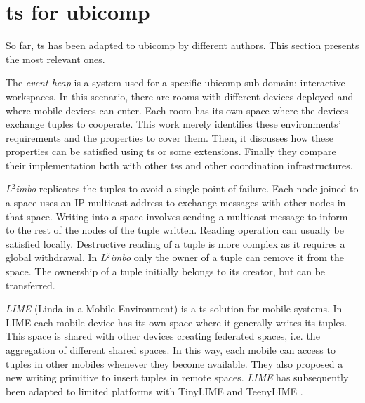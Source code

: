 \section{\acl{ts} for \ac{ubicomp}}
\label{sec:soa_ts_ubicomp}

So far, \acl{ts} has been adapted to \acl{ubicomp} by different authors.
This section presents the most relevant ones. %




The \emph{event heap} \citep{johanson_extending_2004} is a system used for a specific \ac{ubicomp} sub-domain: interactive workspaces.
In this scenario, there are rooms with different devices deployed and where mobile devices can enter.
Each room has its own space where the devices exchange tuples to cooperate.
This work merely identifies these environments' requirements and the properties to cover them. %
Then, it discusses how these properties can be satisfied using \ac{ts} or some extensions.
Finally they compare their implementation both with other \acp{ts} and other coordination infrastructures. %


\emph{L$^2$imbo} \citep{davies_l2imbo:_1998,friday_experiences_1999} replicates the tuples to avoid a single point of failure.
Each node joined to a space uses an IP multicast address to exchange messages with other nodes in that space.
Writing into a space involves sending a multicast message to inform to the rest of the nodes of the tuple written.
Reading operation can usually be satisfied locally.
Destructive reading of a tuple is more complex as it requires a global withdrawal.
In \emph{L$^2$imbo} only the owner of a tuple can remove it from the space.
The ownership of a tuple initially belongs to its creator, but can be transferred. %


\emph{LIME} (Linda in a Mobile Environment) \citep{picco_lime:_1999} is a \ac{ts} solution for mobile systems.
In LIME each mobile device has its own space where it generally writes its tuples.
This space is shared with other devices creating federated spaces, i.e. the aggregation of different shared spaces.
In this way, each mobile can access to tuples in other mobiles whenever they become available.
They also proposed a new writing primitive to insert tuples in remote spaces.
\emph{LIME} has subsequently been adapted to limited platforms \citep{murphy_transiently_2006} with TinyLIME \citep{curino_tinylime:_2005} and TeenyLIME \citep{costa_programming_2007}.

